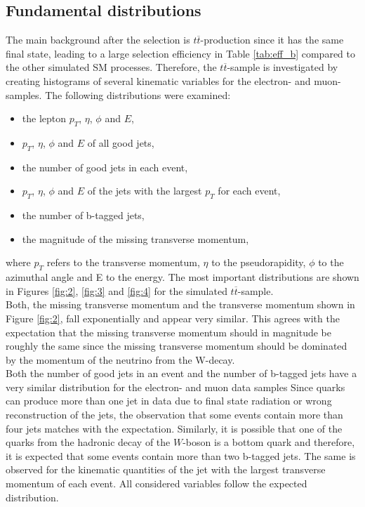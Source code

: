 \begin{table}[H]
  \end{table}


\subsection{Fundamental distributions} \label{sec:sekunde}
The main background after the selection is $t \overline{t}$-production since it has the same final state, leading to a large selection efficiency
in Table \ref{tab:eff_b} compared to the other simulated SM processes.
Therefore, the $t \overline{t}$-sample is investigated by creating
histograms of several kinematic variables for the electron- and muon-samples.
The following distributions were examined:
\begin{itemize}
  \item the lepton $p_T$, $\eta$, $\phi$ and $E$,
  \item $p_T$, $\eta$, $\phi$ and $E$ of all good jets,
  \item the number of good jets in each event,
  \item $p_T$, $\eta$, $\phi$ and $E$ of the jets with the largest $p_T$ for each event,
  \item the number of b-tagged jets,
  \item the magnitude of the missing transverse momentum,
\end{itemize}
where $p_T$ refers to the transverse momentum, $\eta$ to the pseudorapidity, $\phi$ to the azimuthal angle and E to the energy.
The most important distributions are shown in Figures \ref{fig:2}, \ref{fig:3} and \ref{fig:4} for the simulated $t\overline{t}$-sample. \\
Both, the missing transverse momentum and the transverse momentum shown in Figure \ref{fig:2}, fall exponentially and appear very similar.
This agrees with the expectation that the missing transverse momentum should in magnitude be roughly the same since the missing
transverse momentum should be dominated by the momentum of the neutrino from the W-decay. \\
Both the number of good jets in an event and the number of b-tagged jets have a very similar distribution for the electron- and muon data samples
Since quarks can produce more than one jet in data due to final state radiation or wrong reconstruction of the jets, the observation that some
events contain more than four jets matches with the expectation.
Similarly, it is possible that one of the quarks from the hadronic decay of the $W$-boson is a bottom quark and therefore, it is expected that some events
contain more than two b-tagged jets.
The same is observed for the kinematic quantities of the jet with the largest transverse momentum of each event. All considered variables follow
the expected distribution.

